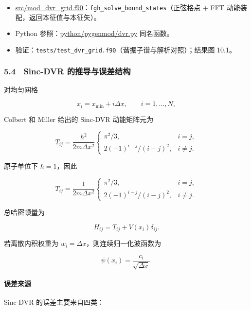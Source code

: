 \documentclass[
]{ctexbook}
\providecommand{\tightlist}{%
  \setlength{\itemsep}{0pt}\setlength{\parskip}{0pt}}
\begin{document}
\begin{itemize}
\tightlist
\item
  \href{https://github.com/l1Ha/QuantumGeneralModule/blob/main/src/mod_dvr_grid.f90}{src/mod\_dvr\_grid.f90}：\texttt{fgh\_solve\_bound\_states}（正弦格点
  + FFT 动能装配，返回本征值与本征矢）。
\item
  Python
  参照：\href{https://github.com/l1Ha/QuantumGeneralModule/blob/main/python/pygenmod/dvr.py}{python/pygenmod/dvr.py}
  同名函数。
\item
  验证：\texttt{tests/test\_dvr\_grid.f90}（谐振子谱与解析对照）；结果图
  10.1。
\end{itemize}

\hypertarget{sinc-dvr-ux7684ux63a8ux5bfcux4e0eux8befux5deeux7ed3ux6784}{%
\subsubsection{5.4　Sinc-DVR
的推导与误差结构}\label{sinc-dvr-ux7684ux63a8ux5bfcux4e0eux8befux5deeux7ed3ux6784}}

对均匀网格

\[
x_i=x_{\min}+i\Delta x,
\qquad
i=1,\ldots,N,
\]

Colbert 和 Miller 给出的 Sinc-DVR 动能矩阵元为

\[
T_{ij}
=
\frac{\hbar^2}{2m\Delta x^2}
\begin{cases}
\pi^2/3, & i=j,\\[4pt]
2(-1)^{i-j}/(i-j)^2, & i\ne j.
\end{cases}
\]

原子单位下 \(\hbar=1\)，因此

\[
T_{ij}
=
\frac{1}{2m\Delta x^2}
\begin{cases}
\pi^2/3, & i=j,\\[4pt]
2(-1)^{i-j}/(i-j)^2, & i\ne j.
\end{cases}
\]

总哈密顿量为

\[
H_{ij}=T_{ij}+V(x_i)\delta_{ij}.
\]

若离散内积权重为 \(w_i=\Delta x\)，则连续归一化波函数为

\[
\psi(x_i)=\frac{c_i}{\sqrt{\Delta x}}.
\]

\hypertarget{ux8befux5deeux6765ux6e90}{%
\paragraph{误差来源}\label{ux8befux5deeux6765ux6e90}}

Sinc-DVR 的误差主要来自四类：
\end{document}
